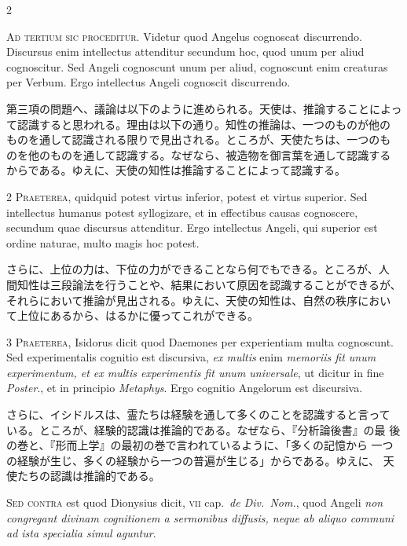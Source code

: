 \documentclass[paper=a4paper,fontsize=10pt,jafontsize=9pt,titlepage]{jlreq}
\begin{document}
\begin{paracol}{2}

{\Huge A}{\scshape d tertium sic proceditur}. Videtur quod Angelus
cognoscat discurrendo. Discursus enim intellectus attenditur secundum
hoc, quod unum per aliud cognoscitur. Sed Angeli cognoscunt unum per
aliud, cognoscunt enim creaturas per Verbum. Ergo intellectus Angeli
cognoscit discurrendo.

\switchcolumn

第三項の問題へ、議論は以下のように進められる。天使は、推論することによっ
て認識すると思われる。理由は以下の通り。知性の推論は、一つのものが他の
ものを通して認識される限りで見出される。ところが、天使たちは、一つのも
のを他のものを通して認識する。なぜなら、被造物を御言葉を通して認識する
からである。ゆえに、天使の知性は推論することによって認識する。

\switchcolumn*

{\scshape 2 Praeterea}, quidquid potest virtus inferior,
potest et virtus superior. Sed intellectus humanus potest syllogizare,
et in effectibus causas cognoscere, secundum quae discursus
attenditur. Ergo intellectus Angeli, qui superior est ordine naturae,
multo magis hoc potest.

\switchcolumn

さらに、上位の力は、下位の力ができることなら何でもできる。ところが、人
間知性は三段論法を行うことや、結果において原因を認識することができるが、
それらにおいて推論が見出される。ゆえに、天使の知性は、自然の秩序におい
て上位にあるから、はるかに優ってこれができる。

\switchcolumn*

{\scshape 3 Praeterea}, Isidorus dicit quod Daemones per experientiam
multa cognoscunt. Sed experimentalis cognitio est discursiva,
{\itshape ex multis} enim {\itshape memoriis fit unum experimentum, et
ex multis experimentis fit unum universale}, ut dicitur in fine
{\itshape Poster}., et in principio {\itshape Metaphys}. Ergo cognitio
Angelorum est discursiva.

\switchcolumn

さらに、イシドルスは、霊たちは経験を通して多くのことを認識すると言って
いる。ところが、経験的認識は推論的である。なぜなら、『分析論後書』の最
後の巻と、『形而上学』の最初の巻で言われているように、「多くの記憶から
一つの経験が生じ、多くの経験から一つの普遍が生じる」からである。ゆえに、
天使たちの認識は推論的である。

\switchcolumn*

{\scshape Sed contra} est quod Dionysius dicit, {\scshape vii}
cap.~{\itshape de Div.~Nom.}, quod Angeli {\itshape non congregant divinam cognitionem a
sermonibus diffusis, neque ab aliquo communi ad ista specialia simul
aguntur}.


\end{paracol}
\end{document}
